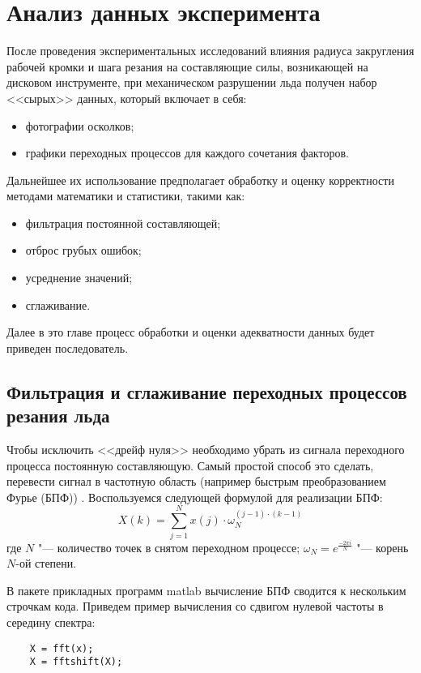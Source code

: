 \chapter{Анализ данных эксперимента}\label{chapt3}

После проведения экспериментальных исследований влияния радиуса закругления рабочей кромки и шага резания на составляющие силы, возникающей на дисковом инструменте, при механическом разрушении льда получен набор <<сырых>> данных, который включает в себя:
\begin{itemize}
	\item фотографии осколков;
	\item графики переходных процессов для каждого сочетания факторов.
\end{itemize}

Дальнейшее их использование предполагает обработку и оценку корректности методами математики и статистики, такими как:
\begin{itemize}
	\item фильтрация постоянной составляющей;
	\item отброс грубых ошибок;
	\item усреднение значений;
	
	
	\item сглаживание.
\end{itemize}

Далее в это главе процесс обработки и оценки адекватности данных будет приведен последователь.

\section{Фильтрация и сглаживание переходных процессов резания льда}\label{sect3_1}

Чтобы исключить <<дрейф нуля>> необходимо убрать из сигнала переходного процесса постоянную составляющую. Самый простой способ это сделать, перевести сигнал в частотную область (например быстрым преобразованием Фурье (БПФ)) \cite{BPF,BPFEng}. Воспользуемся следующей формулой для реализации БПФ:
\begin{equation}\label{eq:FFT}
X(k)=\sum_{j=1}^{N} x(j)\cdot\omega_{N}^{(j-1)\cdot(k-1)}
\end{equation}
где $ N $ "--- количество точек в снятом переходном процессе; $ \omega_{N} = e^{\frac{-2\pi i}{N}} $ "--- корень $ N $-ой степени.

В пакете прикладных программ matlab вычисление БПФ сводится к нескольким строчкам кода. Приведем пример вычисления со сдвигом нулевой частоты в середину спектра:
\begin{lstlisting}
	X = fft(x);
	X = fftshift(X);
\end{lstlisting}

